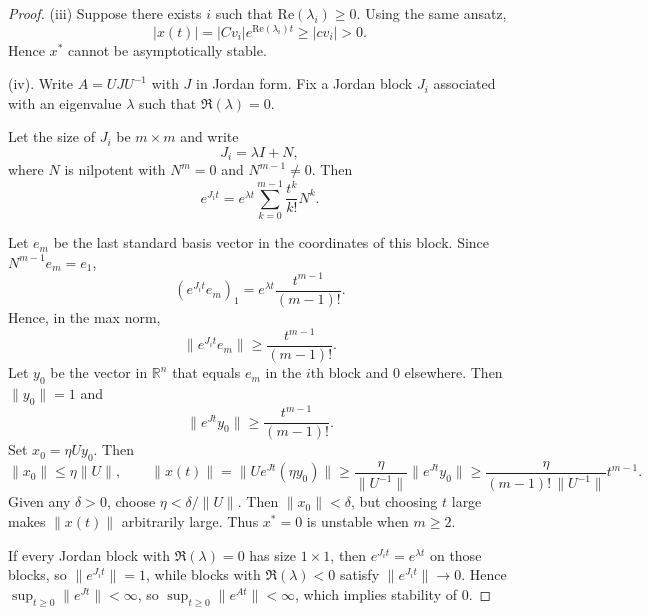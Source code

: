 \documentclass{tufte-handout}
\newcommand*\R{\mathbb{R}}
\theoremstyle{definition}
\begin{document}
\begin{proof}
	(iii) Suppose there exists $i$ such that $\text{Re} (\lambda_i) \ge 0$. Using the same ansatz, \[
		\left| x(t) \right| = \left| C v_i \right| e^{\text{Re} (\lambda_i) t} \ge \left| c v_i \right| > 0
	.\] Hence $x^*$ cannot be asymptotically stable.

	(iv).
	Write $A = UJU^{-1}$ with $J$ in Jordan form. Fix a Jordan block
	$J_i$ associated with an eigenvalue $\lambda$ such that $\Re(\lambda)=0$.

	Let the size of $J_i$ be $m\times m$ and write
	\[
	J_i = \lambda I + N,
	\]
	where $N$ is nilpotent with $N^m=0$ and $N^{m-1}\neq 0$. Then
	\[
	e^{J_i t} = e^{\lambda t}\sum_{k=0}^{m-1}\frac{t^k}{k!}N^k.
	\]

	Let $e_m$ be the last standard basis vector in the coordinates of this block.
	Since $N^{m-1}e_m = e_1$,
	\[
	\left(e^{J_i t}e_m\right)_1
	= e^{\lambda t}\frac{t^{m-1}}{(m-1)!}.
	\]
	Hence, in the max norm,
	\[
	\|e^{J_i t}e_m\| \ge \frac{t^{m-1}}{(m-1)!}.
	\]
	Let $y_0$ be the vector in $\R^n$ that equals $e_m$ in the $i$th block and
	$0$ elsewhere. Then $\|y_0\|=1$ and
	\[
	\|e^{J t}y_0\| \ge \frac{t^{m-1}}{(m-1)!}.
	\]
	Set $x_0 = \eta U y_0$. Then
	\[
	\|x_0\| \le \eta \|U\|,
	\qquad
	\|x(t)\|
	= \|Ue^{Jt}(\eta y_0)\|
	\ge \frac{\eta}{\|U^{-1}\|}\|e^{Jt}y_0\|
	\ge \frac{\eta}{(m-1)!\,\|U^{-1}\|}t^{m-1}.
	\]
	Given any $\delta>0$, choose $\eta<\delta/\|U\|$. Then $\|x_0\|<\delta$, but
	choosing $t$ large makes $\|x(t)\|$ arbitrarily large. Thus $x^*=0$ is
	unstable when $m\ge 2$.

	If every Jordan block with $\Re(\lambda)=0$ has size $1\times 1$, then
	$e^{J_i t}=e^{\lambda t}$ on those blocks, so $\|e^{J_i t}\|=1$, while blocks
	with $\Re(\lambda)<0$ satisfy $\|e^{J_i t}\|\to 0$. Hence $\sup_{t\ge 0}\|e^{Jt}\|<\infty$,
	so $\sup_{t\ge 0}\|e^{At}\|<\infty$, which implies stability of $0$.

\end{proof}
\end{document}

